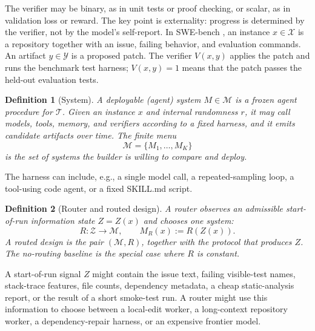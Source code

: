 \documentclass{article}
\newtheorem{definition}{Definition}
\newcommand{\cM}{\mathcal{M}}
\newcommand{\cT}{\mathcal{T}}
\newcommand{\cX}{\mathcal{X}}
\newcommand{\cY}{\mathcal{Y}}
\begin{document}
The verifier may be binary, as in unit tests or proof checking, or scalar, as in validation loss or reward.
The key point is externality: progress is determined by the verifier, not by the model's self-report.
In SWE-bench \citet{jimenez2024swebench}, an instance \(x\in\cX\) is a repository together with an issue, failing behavior, and evaluation commands.
An artifact \(y\in\cY\) is a proposed patch.
The verifier \(V(x,y)\) applies the patch and runs the benchmark test harness; \(V(x,y)=1\) means that the patch passes the held-out evaluation tests.

\begin{definition}[System]
\label{def:design}
A deployable (agent) system \(M\in\cM\) is a frozen agent procedure for \(\cT\).
Given an instance \(x\) and internal randomness \(r\), it may call models, tools, memory, and verifiers according to a fixed harness, and it emits candidate artifacts over time.
The finite menu
\[
    \cM=\{M_1,\ldots,M_K\}
\]
is the set of systems the builder is willing to compare and deploy.
\end{definition}

The harness can include, e.g., a single model call, a repeated-sampling loop, a tool-using code agent, or a fixed SKILL.md script.

\begin{definition}[Router and routed design]
\label{def:router}
A router observes an admissible start-of-run information state \(Z=Z(x)\) and chooses one system:
\[
    R:\mathcal Z\to\cM,
    \qquad
    M_R(x):=R(Z(x)).
\]
A routed design is the pair \((\cM,R)\), together with the protocol that produces \(Z\).
The no-routing baseline is the special case where \(R\) is constant.
\end{definition}
A start-of-run signal \(Z\) might contain the issue text, failing visible-test names, stack-trace features, file counts, dependency metadata, a cheap static-analysis report, or the result of a short smoke-test run.
A router might use this information to choose between a local-edit worker, a long-context repository worker, a dependency-repair harness, or an expensive frontier model.
\end{document}
